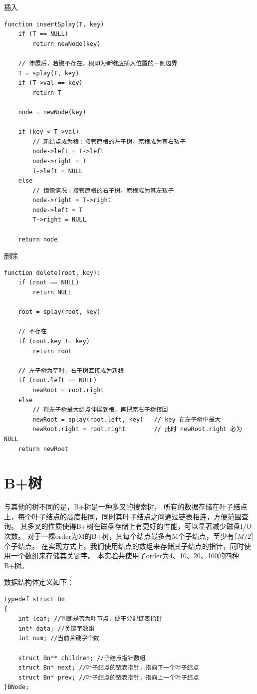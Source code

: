 \documentclass[openany]{book}
\begin{document}
插入
\begin{lstlisting}
function insertSplay(T, key)
    if (T == NULL)
        return newNode(key)

    // 伸展后，若键不存在，根即为新键应插入位置的一侧边界
    T = splay(T, key)
    if (T->val == key)
        return T

    node = newNode(key)

    if (key < T->val)
        // 新结点成为根：接管原根的左子树，原根成为其右孩子
        node->left = T->left
        node->right = T
        T->left = NULL
    else
        // 镜像情况：接管原根的右子树，原根成为其左孩子
        node->right = T->right
        node->left = T
        T->right = NULL

    return node
\end{lstlisting}

删除
\begin{lstlisting}
function delete(root, key):
    if (root == NULL)
        return NULL

    root = splay(root, key)

    // 不存在
    if (root.key != key)              
        return root

    // 左子树为空时，右子树直接成为新根
    if (root.left == NULL)
        newRoot = root.right
    else
        // 将左子树最大结点伸展到根，再把原右子树接回
        newRoot = splay(root.left, key)   // key 在左子树中最大
        newRoot.right = root.right        // 此时 newRoot.right 必为 NULL
    return newRoot
\end{lstlisting}

\section{B+树}
与其他的树不同的是，B+树是一种多叉的搜索树，
所有的数据存储在叶子结点上，每个叶子结点的高度相同，同时其叶子结点之间通过链表相连，方便范围查询。
其多叉的性质使得B+树在磁盘存储上有更好的性能，可以显著减少磁盘I/O次数。
对于一棵order为M的B+树，其每个结点最多有M个子结点，至少有$\lceil M/2 \rceil$个子结点。
在实现方式上，我们使用结点的数组来存储其子结点的指针，同时使用一个数组来存储其关键字。
本实验共使用了order为4、10、20、100的四种B+树。

数据结构体定义如下：
\begin{lstlisting}
typedef struct Bn
{
    int leaf; //判断是否为叶节点，便于分配链表指针
    int* data; //关键字数组
    int num; //当前关键字个数

    struct Bn** children; //子结点指针数组
    struct Bn* next; //叶子结点的链表指针，指向下一个叶子结点
    struct Bn* prev; //叶子结点的链表指针，指向上一个叶子结点
}BNode;
\end{lstlisting}
\end{document}

